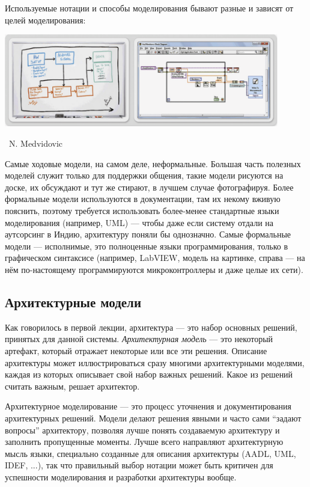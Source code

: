 \documentclass[a5paper]{article}
\newcommand{\attribution}[1] {
	\vspace{-5mm}\begin{flushright}\begin{scriptsize}%
	{\textcopyright\, #1}\end{scriptsize}\end{flushright}
}
\begin{document}
Используемые нотации и способы моделирования бывают разные и зависят от целей моделирования:

\begin{center}
	\includegraphics[width=0.9\textwidth]{sketchesVsFormalNotations.png}
	\attribution{N. Medvidovic}
\end{center}

Самые ходовые модели, на самом деле, неформальные. Большая часть полезных моделей служит только для поддержки общения, такие модели рисуются на доске, их обсуждают и тут же стирают, в лучшем случае фотографируя. Более формальные модели используются в документации, там их некому вживую пояснить, поэтому требуется использовать более-менее стандартные языки моделирования (например, UML) --- чтобы даже если систему отдали на аутсорсинг в Индию, архитектуру поняли бы однозначно. Самые формальные модели --- исполнимые, это полноценные языки программирования, только в графическом синтаксисе (например, LabVIEW, модель на картинке, справа --- на нём по-настоящему программируются микроконтроллеры и даже целые их сети).

\subsection{Архитектурные модели}

Как говорилось в первой лекции, архитектура --- это набор основных решений, принятых для данной системы. \textit{Архитектурная модель} --- это некоторый артефакт, который отражает некоторые или все эти решения. Описание архитектуры может иллюстрироваться сразу многими архитектурными моделями, каждая из которых описывает свой набор важных решений. Какое из решений считать важным, решает архитектор.

Архитектурное моделирование --- это процесс уточнения и документирования архитектурных решений. Модели делают решения явными и часто сами ``задают вопросы'' архитектору, позволяя лучше понять создаваемую архитектуру и заполнить пропущенные моменты. Лучше всего направляют архитектурную мысль языки, специально созданные для описания архитектуры (AADL, UML, IDEF, ...), так что правильный выбор нотации может быть критичен для успешности моделирования и разработки архитектуры вообще.
\end{document}
